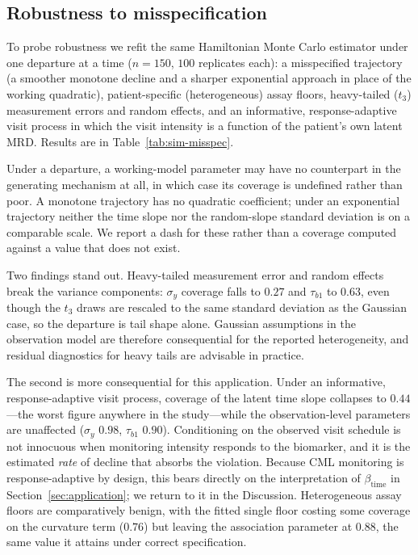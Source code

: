 \documentclass[11pt]{article}
\begin{document}
\subsection{Robustness to misspecification}
\label{sec:sim:misspec}

To probe robustness we refit the same Hamiltonian Monte Carlo estimator under
one departure at a time ($n=150$, $100$ replicates each): a misspecified
trajectory (a smoother monotone decline and a sharper exponential approach in
place of the working quadratic), patient-specific (heterogeneous) assay floors,
heavy-tailed ($t_3$) measurement errors and random effects, and an informative,
response-adaptive visit process in which the visit intensity is a function of
the patient's own latent MRD. Results are in Table~\ref{tab:sim-misspec}.

Under a departure, a working-model parameter may have no counterpart in the
generating mechanism at all, in which case its coverage is undefined rather than
poor. A monotone trajectory has no quadratic coefficient; under an exponential
trajectory neither the time slope nor the random-slope standard deviation is on
a comparable scale. We report a dash for these rather than a coverage computed
against a value that does not exist.

Two findings stand out. Heavy-tailed measurement error and random effects break
the variance components: $\sigma_y$ coverage falls to $0.27$ and $\tau_{b1}$ to
$0.63$, even though the $t_3$ draws are rescaled to the same standard deviation
as the Gaussian case, so the departure is tail shape alone. Gaussian assumptions
in the observation model are therefore consequential for the reported
heterogeneity, and residual diagnostics for heavy tails are advisable in
practice.

The second is more consequential for this application. Under an informative,
response-adaptive visit process, coverage of the latent time slope collapses to
$0.44$---the worst figure anywhere in the study---while the observation-level
parameters are unaffected ($\sigma_y$ $0.98$, $\tau_{b1}$ $0.90$). Conditioning
on the observed visit schedule is not innocuous when monitoring intensity
responds to the biomarker, and it is the estimated \emph{rate} of decline that
absorbs the violation. Because CML monitoring is response-adaptive by design,
this bears directly on the interpretation of $\beta_{\mathrm{time}}$ in
Section~\ref{sec:application}; we return to it in the Discussion. Heterogeneous
assay floors are comparatively benign, with the fitted single floor costing some
coverage on the curvature term ($0.76$) but leaving the association parameter at
$0.88$, the same value it attains under correct specification.
\end{document}
